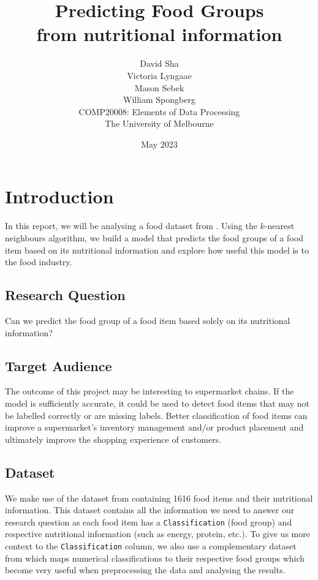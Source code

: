 \documentclass[11pt]{article}
\title{Predicting Food Groups \\ \vspace{0.5em} \large from nutritional information}
\author{
    David Sha\\
\AND
    Victoria Lyngaae\\
\AND
    Mason Sebek\\
\AND
    William Spongberg\\
\AND
\AND
	COMP20008: Elements of Data Processing\\
\AND
	The University of Melbourne\\
}
\date{May 2023}
\begin{document}
\maketitle

\newpage
\tableofcontents
\thispagestyle{empty}

\newpage
\setcounter{page}{1}
\section{Introduction}

In this report, we will be analysing a food dataset from \cite{FoodStandardsAustraliaNewZealand}. Using the \(k\)-nearest neighbours algorithm, we build a model that predicts the food groups of a food item based on its nutritional information and explore how useful this model is to the food industry.

\subsection{Research Question}
Can we predict the food group of a food item based solely on its nutritional information?

\subsection{Target Audience}
The outcome of this project may be interesting to supermarket chains. If the model is sufficiently accurate, it could be used to detect food items that may not be labelled correctly or are missing labels. Better classification of food items can improve a supermarket's inventory management and/or product placement and ultimately improve the shopping experience of customers.

\subsection{Dataset}
We make use of the dataset from \cite{FoodStandardsAustraliaNewZealand} containing 1616 food items and their nutritional information. This dataset contains all the information we need to answer our research question as each food item has a \verb|Classification| (food group) and respective nutritional information (such as energy, protein, etc.). To give us more context to the \verb|Classification| column, we also use a complementary dataset from \cite{FoodClassification} which maps numerical classifications to their respective food groups which become very useful when preprocessing the data and analysing the results.
\end{document}
